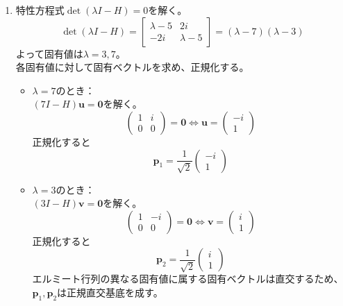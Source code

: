 \documentclass[dvipdfmx]{jsreport}
\begin{document}
\begin{souanswer}
\begin{enumerate}
    よって第一引数に関する線形性が示された。
    \item 特性方程式$\det{(\lambda I- H)}= 0$を解く。
\begin{equation*}
    \det{(\lambda I- H)}= \begin{bmatrix}\lambda- 5& 2i\\ -2i& \lambda- 5\end{bmatrix}= (\lambda- 7)(\lambda- 3)
\end{equation*}
    よって固有値は$\lambda= 3, 7$。\\
    各固有値に対して固有ベクトルを求め、正規化する。
\begin{itemize}
    \item $\lambda= 7$のとき：\\
    $(7I- H)\bm{u}= \bm{0}$を解く。
\begin{equation*}
    \begin{pmatrix}1& i\\ 0& 0\end{pmatrix}= \bm{0}\iff \bm{u}= \begin{pmatrix}-i\\ 1\end{pmatrix}
\end{equation*}
    正規化すると
\begin{equation*}
    \bm{p}_1= \frac{1}{\sqrt{2}}\begin{pmatrix}-i\\ 1\end{pmatrix}
\end{equation*}
    \item $\lambda= 3$のとき：\\
    $(3I- H)\bm{v}= \bm{0}$を解く。
\begin{equation*}
    \begin{pmatrix}1& -i\\ 0& 0\end{pmatrix}= \bm{0}\iff \bm{v}= \begin{pmatrix}i\\ 1\end{pmatrix}
\end{equation*}
    正規化すると
\begin{equation*}
    \bm{p}_2= \frac{1}{\sqrt{2}}\begin{pmatrix}i\\ 1\end{pmatrix}
\end{equation*}
    エルミート行列の異なる固有値に属する固有ベクトルは直交するため、$\bm{p}_1, \bm{p}_2$は正規直交基底を成す。

\end{itemize}
\end{enumerate}
\end{souanswer}
\end{document}
